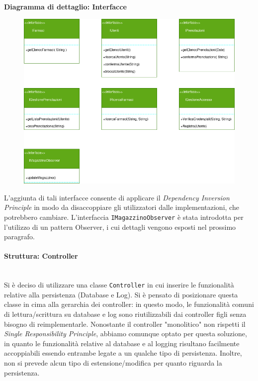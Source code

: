 \textbf{Diagramma di dettaglio: Interfacce}
\begin{figure}[h!]
    \begin{center}
        \includegraphics[width=\textwidth]{immagini/Interfacce-progettazione.png}
    \end{center}
\end{figure}

L'aggiunta di tali interfacce consente di applicare il \textit{Dependency Inversion Principle}
in modo da disaccoppiare gli utilizzatori dalle implementazioni, che potrebbero cambiare.
L'interfaccia \texttt{IMagazzinoObserver} è stata introdotta per l'utilizzo di un pattern Observer,
i cui dettagli vengono esposti nel prossimo paragrafo.

\newpage

\paragraph{Struttura: Controller}\mbox{}\\

Si è deciso di utilizzare una classe \texttt{Controller} in cui inserire le funzionalità relative alla persistenza (Database e Log).
Si è pensato di posizionare questa classe in cima alla gerarchia dei controller: 
in questo modo, le funzionalità comuni di lettura/scrittura su database e log sono riutilizzabili dai controller figli senza bisogno di reimplementarle.
Nonostante il controller "monolitico" non rispetti il \textit{Single Responsibility Principle}, 
abbiamo comunque optato per questa soluzione, in quanto le funzionalità relative al database e al logging risultano facilmente accoppiabili essendo entrambe legate a un qualche tipo di persistenza.
Inoltre, non si prevede alcun tipo di estensione/modifica per quanto riguarda la persistenza.
\vspace{2em}

